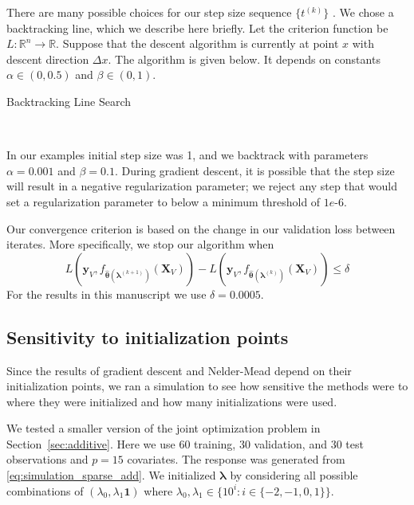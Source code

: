 \documentclass[12pt,letterpaper]{article}
\begin{document}
There are many possible choices for our step size sequence $\{t^{(k)}\}$ \citep{boyd2004convex}. We chose a backtracking line, which we describe here briefly. Let the criterion function be $L:\mathbb{R}^n \rightarrow \mathbb{R}$. Suppose that the descent algorithm is currently at point $x$ with descent direction $\Delta x$. The algorithm is given below. It depends on constants $\alpha  \in (0, 0.5)$ and $\beta \in (0,1)$.
\begin{algorithm}
	\caption{Backtracking Line Search} \label{alg:backtracking}
	\begin{algorithmic}
		 \\
		\ENDWHILE
	\end{algorithmic}
\end{algorithm}
In our examples initial step size was 1, and we backtrack with parameters $\alpha = 0.001$ and $\beta = 0.1$. During gradient descent, it is possible that the step size will result in a negative regularization parameter; we reject any step that would set a regularization parameter to below a minimum threshold of $1e$-6.

Our convergence criterion is based on the change in our validation loss between iterates. More specifically, we stop our algorithm when
\[
L \left( \boldsymbol{y}_V, f_{\hat{\boldsymbol \theta}(\boldsymbol{\lambda}^{(k+1)})}(\boldsymbol{X}_V)\right) -
L \left( \boldsymbol{y}_V, f_{\hat{\boldsymbol \theta}(\boldsymbol{\lambda}^{(k)})}(\boldsymbol{X}_V)\right) \leq \delta
\]
For the results in this manuscript we use $\delta = 0.0005$.

\subsection{Sensitivity to initialization points}
Since the results of gradient descent and Nelder-Mead depend on their initialization points, we ran a simulation to see how sensitive the methods were to where they were initialized and how many initializations were used.

We tested a smaller version of the joint optimization problem in  Section~\ref{sec:additive}. Here we use 60 training, 30 validation, and 30 test observations and $p = 15$ covariates. The response was generated from \eqref{eq:simulation_sparse_add}. We initialized $\boldsymbol{\lambda}$ by considering all possible combinations of $(\lambda_0, \lambda_1 \boldsymbol{1})$ where $\lambda_0, \lambda_1 \in \{10^i: i\in\{-2, -1, 0, 1\}\}$.
\end{document}
